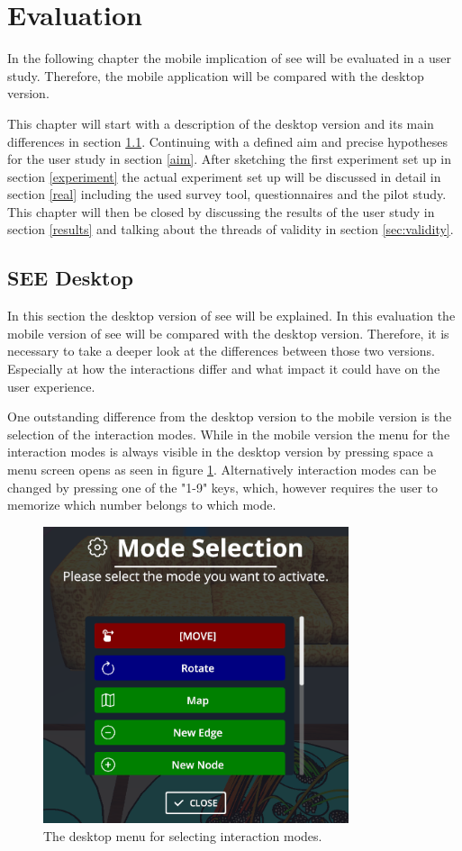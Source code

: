 \section{Evaluation}
\label{section:evaluation}
In the following chapter the mobile implication of \gls{see} will be evaluated in a user study.
Therefore, the mobile application will be compared with the desktop version.

This chapter will start with a description of the desktop version and its main differences in section \ref{desktop}.
Continuing with a defined aim and precise hypotheses for the user study in section \ref{aim}.
After sketching the first experiment set up in section \ref{experiment} the actual experiment set up will be discussed in detail in section \ref{real} including the used survey tool, questionnaires and the pilot study.
This chapter will then be closed by discussing the results of the user study in section \ref{results} and talking about the threads of validity in section \ref{sec:validity}.
\subsection{SEE Desktop}
\label{desktop}
In this section the desktop version of \gls{see} will be explained.
In this evaluation the mobile version of \gls{see} will be compared with the desktop version.
Therefore, it is necessary to take a deeper look at the differences between those two versions.
Especially at how the interactions differ and what impact it could have on the user experience.

One outstanding difference from the desktop version to the mobile version is the selection of the interaction modes.
While in the mobile version the menu for the interaction modes is always visible in the desktop version by pressing space a menu screen opens as seen in figure \ref{fig:menu}.
Alternatively interaction modes can be changed by pressing one of the "1-9" keys, which, however requires the user to memorize which number belongs to which mode.

\begin{figure}[htb]
  \centering
  \includegraphics[width=0.8\textwidth]{Evaluation/img/menu.png}
  \caption{The desktop menu for selecting interaction modes.}\label{fig:menu}
\end{figure}

